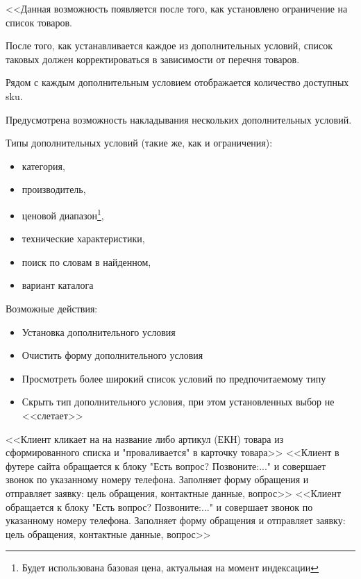 {
<<Данная возможность появляется после того, как установлено ограничение на список товаров.

После того, как устанавливается каждое из дополнительных условий, список таковых должен корректироваться в зависимости от перечня товаров.

Рядом с каждым дополнительным условием отображается количество доступных sku.

Предусмотрена возможность накладывания нескольких дополнительных условий.

Типы дополнительных условий (такие же, как и ограничения):

\begin{itemize}
\item категория, 
\item производитель, 
\item ценовой диапазон\footnote{Будет использована базовая цена, актуальная на момент индексации}, 
\item технические характеристики, 
\item поиск по словам в найденном, 
\item вариант каталога
\end{itemize}

Возможные действия:

\begin{itemize}
\item Установка дополнительного условия
\item Очистить форму дополнительного условия
\item Просмотреть более широкий список условий по предпочитаемому типу
\item Скрыть тип дополнительного условия, при этом установленных выбор не <<слетает>>
\end{itemize}
}
{
<<Клиент кликает на на название либо артикул (ЕКН) товара из сформированного списка и "проваливается" в карточку товара>>
}
{
<<Клиент в футере сайта обращается к блоку "Есть вопрос? Позвоните:..." и совершает звонок по указанному номеру телефона.
Заполняет форму обращения и отправляет заявку: цель обращения, контактные данные, вопрос>>
}
{
<<Клиент обращается к блоку "Есть вопрос? Позвоните:..." и совершает звонок по указанному номеру телефона.
Заполняет форму обращения и отправляет заявку: цель обращения, контактные данные, вопрос>>
}

